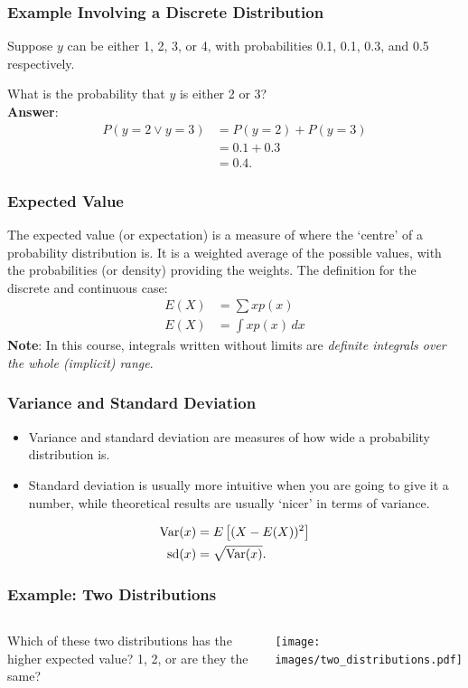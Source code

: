 \documentclass{beamer}
\newcommand{\Var}{\textnormal{Var}}
\begin{document}
\begin{frame}
\frametitle{Example Involving a Discrete Distribution}
Suppose $y$ can be either 1, 2, 3, or 4, with probabilities
0.1, 0.1, 0.3, and 0.5 respectively.\pause

What is the probability that $y$ is either 2 or 3?\\\pause
{\bf Answer}:
\begin{align}
P(y = 2 \vee y=3) &= P(y=2) + P(y=3) \\
                  &= 0.1 + 0.3 \\
                  &= 0.4.
\end{align}

\end{frame}


\begin{frame}
\frametitle{Expected Value}
The expected value (or expectation) is a measure of where the
`centre' of a probability distribution is. It is a weighted average
of the possible values, with the probabilities (or density) providing
the weights. The definition for the discrete and continuous case:
\begin{align}
E(X) &= \sum x p(x) \\
E(X) &= \int x p(x) \, dx
\end{align}\pause
{\bf Note}: In this course, integrals written without limits are
{\em definite integrals over the whole (implicit) range}.

\end{frame}


\begin{frame}
\frametitle{Variance and Standard Deviation}
\begin{itemize}
\item Variance and standard deviation are measures of how wide
a probability distribution is.\pause
\item Standard deviation is usually more intuitive
when you are going to give it a number, while theoretical
results are usually `nicer' in terms of variance.\pause
\end{itemize}
\begin{align}
\Var(x) &= E\left[(X - E(X))^2\right] \\
\textnormal{sd}(x) &= \sqrt{\Var(x)}.
\end{align}

\end{frame}


\begin{frame}
\frametitle{Example: Two Distributions}

    \begin{columns} %
        Which of these two distributions has the higher expected value?
        1, 2, or are they the same?

        \texttt{[image: images/two\_distributions.pdf]}

     \end{columns}

\end{frame}
\end{document}
